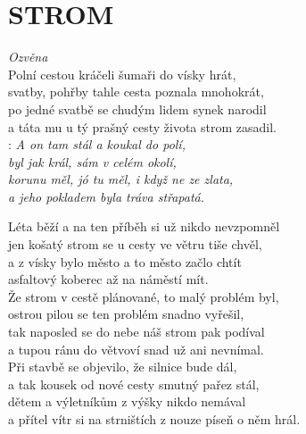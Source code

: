 \section*{\Huge STROM}
\emph{Ozvěna}\\

Polní cestou kráčeli šumaři do vísky hrát,\\
svatby, pohřby tahle cesta poznala mnohokrát,\\
po jedné svatbě se chudým lidem synek narodil\\
a táta mu u tý prašný cesty života strom zasadil.\\

\textregistered: \emph{A on tam stál a koukal do polí,\\
byl jak král, sám v celém okolí,\\
korunu měl, jó tu měl, i když ne ze zlata,\\
a jeho pokladem byla tráva střapatá.}\\

\begin{Large}

Léta běží a na ten příběh si už nikdo nevzpomněl\\
jen košatý strom se u cesty ve větru tiše chvěl,\\
a z vísky bylo město a to město začlo chtít\\
asfaltový koberec až na náměstí mít. \textregistered\\

Že strom v cestě plánované, to malý problém byl,\\
ostrou pilou se ten problém snadno vyřešil,\\
tak naposled se do nebe náš strom pak podíval\\
a tupou ránu do větvoví snad už ani nevnímal. \textregistered\\

Při stavbě se objevilo, že silnice bude dál,\\
a tak kousek od nové cesty smutný pařez stál,\\
dětem a výletníkům z výšky nikdo nemával\\
a přítel vítr si na strništích z nouze píseň o něm hrál. \textregistered

\end{Large}

\newpage
